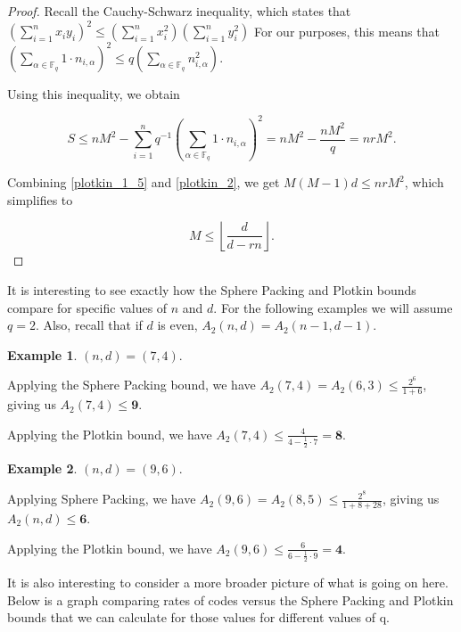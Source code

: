 \documentclass{article}
\theoremstyle{definition}
\newtheorem{exmp}{Example}
\numberwithin{exmp}{subsection}
\begin{document}
\begin{proof}
Recall the Cauchy-Schwarz inequality, which states that $\left(\sum_{i=1}^n x_i y_i \right )^2 \le \left(\sum_{i=1}^n x_i^2 \right ) \left(\sum_{i=1}^n y_i^2 \right )$
For our purposes, this means that $\left(\sum_{\alpha\in\mathbb{F}_q} 1\cdot n_{i,\alpha} \right )^2 \le q \left(\sum_{\alpha\in\mathbb{F}_q} n_{i,\alpha}^2 \right )$.

Using this inequality, we obtain

\begin{equation} \label{plotkin_2}
S \le nM^2 - \sum_{i=1}^n q^{-1} \left(\sum_{\alpha\in\mathbb{F}_q} 1\cdot n_{i,\alpha} \right )^2 = nM^2 - \frac{nM^2}{q} = nrM^2.
\end{equation}

Combining \ref{plotkin_1_5} and \ref{plotkin_2}, we get $M(M-1)d \le nrM^2$, which simplifies to 

\begin{equation}
M \le \left\lfloor \frac{d}{d-rn} \right\rfloor.
\end{equation}

\end{proof}

It is interesting to see exactly how the Sphere Packing and Plotkin bounds compare for specific values of $n$ and $d$.  For the following examples we will assume $q=2$.    
Also, recall that if $d$ is even, $A_2(n,d) = A_2(n-1,d-1)$.  

\begin{exmp}
$(n,d) = (7,4)$.

Applying the Sphere Packing bound, we have $A_2(7,4) = A_2(6,3) \le \frac{2^6}{1 + 6}$, 
giving us $A_2(7,4) \le \textbf{9}$.

Applying the Plotkin bound, we have $A_2(7,4) \le \frac{4}{4-\frac{1}{2}\cdot7} = \textbf{8}$.

\end{exmp}

\begin{exmp}
$(n,d) = (9,6)$.

Applying Sphere Packing, we have  $A_2(9,6) = A_2(8,5) \le \frac{2^8}{1+8+28}$, giving us $A_2(n,d) \le \textbf{6}$.

Applying the Plotkin bound, we have $A_2(9,6) \le \frac{6}{6-\frac{1}{2}\cdot9} = \textbf{4}$.
\end{exmp}

It is also interesting to consider a more broader picture of what is going on here.  Below is a graph comparing rates of codes versus the Sphere Packing and Plotkin bounds
that we can calculate for those values for different values of q.  
\end{document}
